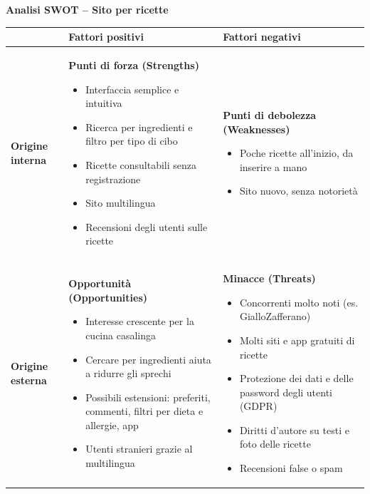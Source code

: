 \documentclass[a4paper]{article}
\begin{document}
\begin{center}
{\Large \textbf{Analisi SWOT -- Sito per ricette}}
\end{center}

\vspace{0.5cm}

\renewcommand{\arraystretch}{1.3}
\begin{tabularx}{\textwidth}{|>{\centering\arraybackslash}m{2.4cm}|X|X|}
\hline
 & \centering\textbf{Fattori positivi} & \centering\arraybackslash\textbf{Fattori negativi} \\
\hline

\textbf{Origine interna}
&
\textbf{Punti di forza (Strengths)}
\begin{itemize}
  \item Interfaccia semplice e intuitiva
  \item Ricerca per ingredienti e filtro per tipo di cibo
  \item Ricette consultabili senza registrazione
  \item Sito multilingua
  \item Recensioni degli utenti sulle ricette
\end{itemize}
&
\textbf{Punti di debolezza (Weaknesses)}
\begin{itemize}
  \item Poche ricette all'inizio, da inserire a mano
  \item Sito nuovo, senza notorietà
\end{itemize}
\\
\hline

\textbf{Origine esterna}
&
\textbf{Opportunità (Opportunities)}
\begin{itemize}
  \item Interesse crescente per la cucina casalinga
  \item Cercare per ingredienti aiuta a ridurre gli sprechi
  \item Possibili estensioni: preferiti, commenti, filtri per dieta e allergie, app
  \item Utenti stranieri grazie al multilingua
\end{itemize}
&
\textbf{Minacce (Threats)}
\begin{itemize}
  \item Concorrenti molto noti (es. GialloZafferano)
  \item Molti siti e app gratuiti di ricette
  \item Protezione dei dati e delle password degli utenti (GDPR)
  \item Diritti d'autore su testi e foto delle ricette
  \item Recensioni false o spam
\end{itemize}
\\
\hline
\end{tabularx}
\end{document}
